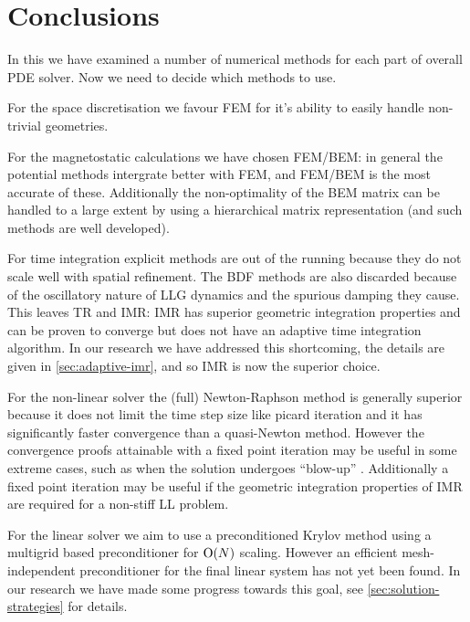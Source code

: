 \section{Conclusions}
\label{sec:num-meth-conclusions}

In this  we have examined a number of numerical methods for each part of overall PDE solver.
Now we need to decide which methods to use.

For the space discretisation we favour FEM for it's ability to easily handle non-trivial geometries.

For the magnetostatic calculations we have chosen FEM/BEM: in general the potential methods intergrate better with FEM, and FEM/BEM is the most accurate of these.
Additionally the non-optimality of the BEM matrix can be handled to a large extent by using a hierarchical matrix representation (and such methods are well developed). 

For time integration explicit methods are out of the running because they do not scale well with spatial refinement. 
The BDF methods are also discarded because of the oscillatory nature of LLG dynamics and the spurious damping they cause.
This leaves TR and IMR: IMR has superior geometric integration properties and can be proven to converge but does not have an adaptive time integration algorithm.
In our research we have addressed this shortcoming, the details are given in \cref{sec:adaptive-imr}, and so IMR is now the superior choice.

For the non-linear solver the (full) Newton-Raphson method is generally superior because it does not limit the time step size like picard iteration and it has significantly faster convergence than a quasi-Newton method.
However the convergence proofs attainable with a fixed point iteration may be useful in some extreme cases, such as when the solution undergoes ``blow-up'' \cite{something by numerical analyst guys}.
Additionally a fixed point iteration may be useful if the geometric integration properties of IMR are required for a non-stiff LL problem.

For the linear solver we aim to use a preconditioned Krylov method using a multigrid based preconditioner for $\text{O}{\left( N \right)}$ scaling.
However an efficient mesh-independent preconditioner for the final linear system has not yet been found. 
In our research we have made some progress towards this goal, see \cref{sec:solution-strategies} for details.

